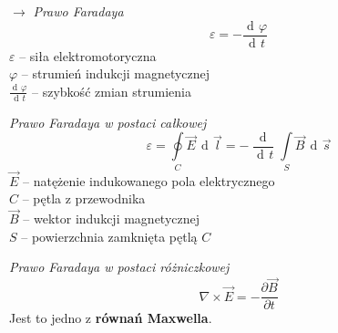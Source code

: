 \documentclass[12pt]{article}
\newenvironment{wzor}[1]{\par{\Large $\longrightarrow$ \textit{#1}}}
    {\newline {\color{grey} \rule{\linewidth}{0.3pt}}}
\DeclareMathOperator{\der}{\operatorname{d}\!}
\begin{document}
\begin{wzor}{Prawo Faradaya}
    \begin{equation}
        \varepsilon = - \frac{\der\varphi}{\der t}
    \end{equation}
    $\varepsilon$ -- siła elektromotoryczna\\
    $\varphi$ -- strumień indukcji magnetycznej\\
    $\frac{\der\varphi}{\der t}$ -- szybkość zmian strumienia

    \newpage
    
    \par \textit{Prawo Faradaya w postaci całkowej}
    \begin{equation}
        \varepsilon = \oint\limits_C \Vec{E} \, \der\Vec{l}
            = - \frac{\der}{\der t} \int\limits_S \Vec{B} \, \der\Vec{s}
    \end{equation}
    $\Vec{E}$ -- natężenie indukowanego pola elektrycznego\\
    $C$ -- pętla z przewodnika\\
    $\Vec{B}$ -- wektor indukcji magnetycznej\\
    $S$ -- powierzchnia zamknięta pętlą $C$
    
    \par \textit{Prawo Faradaya w postaci różniczkowej}
    \begin{equation}
        \nabla \times \Vec{E} = - \frac{\partial \Vec{B}}{\partial t}
    \end{equation}
    Jest to jedno z \textbf{równań Maxwella}.
\end{wzor}
\end{document}
